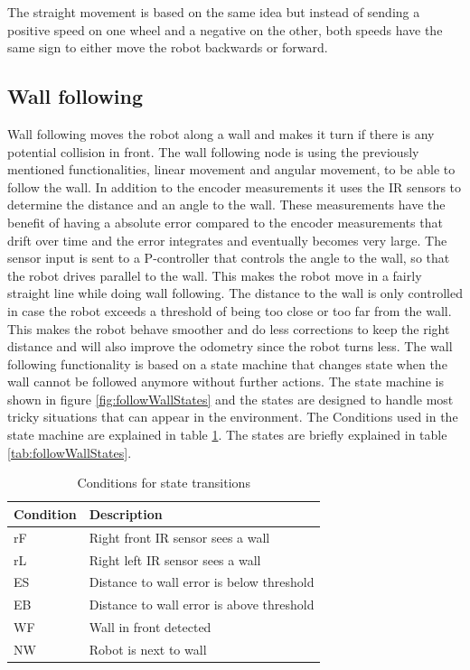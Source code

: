 The straight movement is based on the same idea but instead of sending a positive speed on one wheel and a negative on the other, both speeds have the same sign to either move the robot backwards or forward. 

\subsection{Wall following}
\label{subsec:wallFollowing}

Wall following moves the robot along a wall and makes it turn if there is any potential collision in front. The wall following node is using the previously mentioned functionalities, linear movement and angular movement, to be able to follow the wall. In addition to the encoder measurements it  uses the IR sensors to determine the distance and an angle to the wall. These measurements have the benefit of having a absolute error compared to the encoder measurements that drift over time and the error integrates and eventually becomes very large.
	The sensor input is sent to a P-controller that controls the angle to the wall, so that the robot drives parallel to the wall. This makes the robot move in a fairly straight line while doing wall following. The distance to the wall is only controlled in case the robot exceeds a threshold of being too close or too far from the wall. This makes the robot behave smoother and do less corrections to keep the right distance and will also improve the odometry since the robot turns less.
	The wall following functionality is based on a state machine that changes state when the wall cannot be followed anymore without further actions. The state machine is shown in figure  \ref{fig:followWallStates} and the states are designed to handle most tricky situations that can appear in the environment. The Conditions used in the state machine are explained in table \ref{tab:conditions}. The states are briefly explained in table \ref{tab:followWallStates}.

\begin{table}[h!]
\caption{Conditions for state transitions}
\centering
  \begin{tabular}{l|l}
    \textbf{Condition} & \textbf{Description} \\ \hline
    rF & Right front IR sensor sees a wall \\ \hline
    rL & Right left IR sensor sees a wall \\ \hline
    ES & Distance to wall error is below threshold \\ \hline
    EB & Distance to wall error is above threshold \\ \hline
    WF & Wall in front detected \\ \hline
    NW & Robot is next to wall \\
  \end{tabular}
  \label{tab:conditions}
\normalsize
\end{table}


